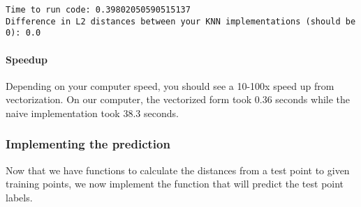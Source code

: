 \documentclass[11pt]{article}
\begin{document}
    \begin{Verbatim}[commandchars=\\\{\}]
Time to run code: 0.39802050590515137
Difference in L2 distances between your KNN implementations (should be 0): 0.0

    \end{Verbatim}

    \hypertarget{speedup}{%
\paragraph{Speedup}\label{speedup}}

Depending on your computer speed, you should see a 10-100x speed up from
vectorization. On our computer, the vectorized form took 0.36 seconds
while the naive implementation took 38.3 seconds.

    \hypertarget{implementing-the-prediction}{%
\subsubsection{Implementing the
prediction}\label{implementing-the-prediction}}

Now that we have functions to calculate the distances from a test point
to given training points, we now implement the function that will
predict the test point labels.
\end{document}
